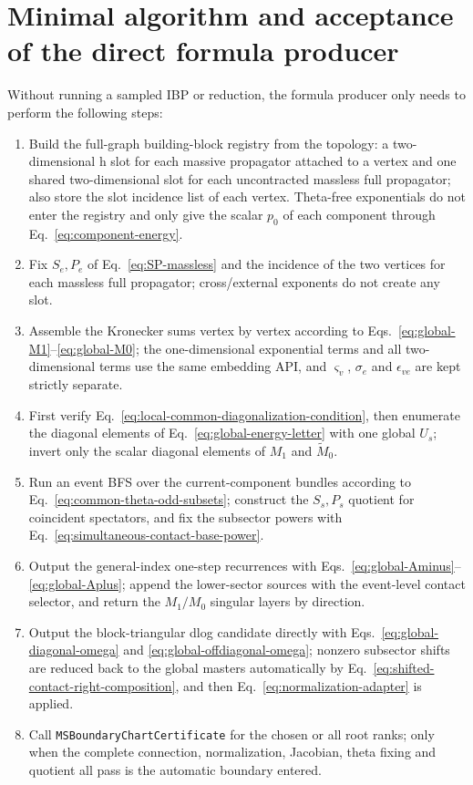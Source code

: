 \documentclass[11pt,a4paper]{article}
\begin{document}
\section{Minimal algorithm and acceptance of the direct formula producer}

Without running a sampled IBP or reduction, the formula producer only needs to perform the following steps:
\begin{enumerate}[label=\arabic*.]
  \item Build the full-graph building-block registry from the topology: a two-dimensional h slot for each massive propagator attached to a vertex and one shared two-dimensional slot for each uncontracted massless full propagator; also store the slot incidence list of each vertex. Theta-free exponentials do not enter the registry and only give the scalar $p_0$ of each component through Eq.~\eqref{eq:component-energy}.
  \item Fix $S_e,P_e$ of Eq.~\eqref{eq:SP-massless} and the incidence of the two vertices for each massless full propagator; cross/external exponents do not create any slot.
  \item Assemble the Kronecker sums vertex by vertex according to Eqs.~\eqref{eq:global-M1}--\eqref{eq:global-M0}; the one-dimensional exponential terms and all two-dimensional terms use the same embedding API, and $\varsigma_v$, $\sigma_e$ and $\epsilon_{ve}$ are kept strictly separate.
  \item First verify Eq.~\eqref{eq:local-common-diagonalization-condition}, then enumerate the diagonal elements of Eq.~\eqref{eq:global-energy-letter} with one global $U_s$; invert only the scalar diagonal elements of $M_1$ and $\widetilde M_0$.
  \item Run an event BFS over the current-component bundles according to Eq.~\eqref{eq:common-theta-odd-subsets}; construct the $S_s,P_s$ quotient for coincident spectators, and fix the subsector powers with Eq.~\eqref{eq:simultaneous-contact-base-power}.
  \item Output the general-index one-step recurrences with Eqs.~\eqref{eq:global-Aminus}--\eqref{eq:global-Aplus}; append the lower-sector sources with the event-level contact selector, and return the $M_1/M_0$ singular layers by direction.
  \item Output the block-triangular dlog candidate directly with Eqs.~\eqref{eq:global-diagonal-omega} and \eqref{eq:global-offdiagonal-omega}; nonzero subsector shifts are reduced back to the global masters automatically by Eq.~\eqref{eq:shifted-contact-right-composition}, and then Eq.~\eqref{eq:normalization-adapter} is applied.
  \item Call \texttt{MSBoundaryChartCertificate} for the chosen or all root ranks; only when the complete connection, normalization, Jacobian, theta fixing and quotient all pass is the automatic boundary entered.
\end{enumerate}
\end{document}
